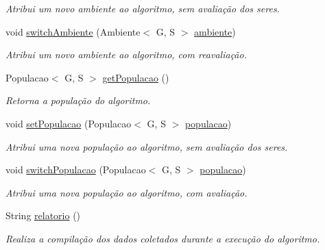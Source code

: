 \begin{DoxyCompactItemize}
\begin{DoxyCompactList}\small\item\em Atribui um novo ambiente ao algoritmo, sem avaliação dos seres. \end{DoxyCompactList}\item 
void \hyperlink{classic_1_1populacional_1_1algoritmo_1_1_algoritmo_evolucionario_3_01_gextends_01_number_01_6_co1efdb05fe19a950b8d1e9e15f7d06254_a85180b600cd1b09c637cd7be58509a7e}{switch\-Ambiente} (Ambiente$<$ G, S $>$ \hyperlink{classic_1_1populacional_1_1algoritmo_1_1_algoritmo_evolucionario_3_01_gextends_01_number_01_6_co1efdb05fe19a950b8d1e9e15f7d06254_a7ccec051269f59db009703ae09400f54}{ambiente})
\begin{DoxyCompactList}\small\item\em Atribui um novo ambiente ao algoritmo, com reavaliação. \end{DoxyCompactList}\item 
Populacao$<$ G, S $>$ \hyperlink{classic_1_1populacional_1_1algoritmo_1_1_algoritmo_evolucionario_3_01_gextends_01_number_01_6_co1efdb05fe19a950b8d1e9e15f7d06254_a88c00c7d51d16c559ccb8392f6892d90}{get\-Populacao} ()
\begin{DoxyCompactList}\small\item\em Retorna a população do algoritmo. \end{DoxyCompactList}\item 
void \hyperlink{classic_1_1populacional_1_1algoritmo_1_1_algoritmo_evolucionario_3_01_gextends_01_number_01_6_co1efdb05fe19a950b8d1e9e15f7d06254_aaf17db98cce445b6f757b9c37810327a}{set\-Populacao} (Populacao$<$ G, S $>$ \hyperlink{classic_1_1populacional_1_1algoritmo_1_1_algoritmo_evolucionario_3_01_gextends_01_number_01_6_co1efdb05fe19a950b8d1e9e15f7d06254_ac925832558d94f84dc90252371f8cb32}{populacao})
\begin{DoxyCompactList}\small\item\em Atribui uma nova população ao algoritmo, sem avaliação dos seres. \end{DoxyCompactList}\item 
void \hyperlink{classic_1_1populacional_1_1algoritmo_1_1_algoritmo_evolucionario_3_01_gextends_01_number_01_6_co1efdb05fe19a950b8d1e9e15f7d06254_a8fc2d9d6a132efd494cf3a8cd44d5446}{switch\-Populacao} (Populacao$<$ G, S $>$ \hyperlink{classic_1_1populacional_1_1algoritmo_1_1_algoritmo_evolucionario_3_01_gextends_01_number_01_6_co1efdb05fe19a950b8d1e9e15f7d06254_ac925832558d94f84dc90252371f8cb32}{populacao})
\begin{DoxyCompactList}\small\item\em Atribui uma nova população ao algoritmo, com avaliação. \end{DoxyCompactList}\item 
String \hyperlink{classic_1_1populacional_1_1algoritmo_1_1_algoritmo_evolucionario_3_01_gextends_01_number_01_6_co1efdb05fe19a950b8d1e9e15f7d06254_a962b55611f2dc3366b6a67328053eaa6}{relatorio} ()
\begin{DoxyCompactList}\small\item\em Realiza a compilação dos dados coletados durante a execução do algoritmo. \end{DoxyCompactList}\end{DoxyCompactItemize}
